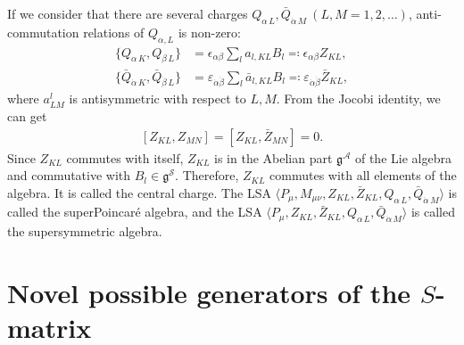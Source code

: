 \documentclass[a4paper,12pt]{article}
\def\nn{\nonumber}
\def\ua{\alpha}
\def\da{\dot{\alpha}}
\def\ub{\beta}
\def\db{\dot{\beta}}
\theoremstyle{plain}
\theoremstyle{definition}
\begin{document}
If we consider that there are several charges $Q_{\ua\, L}, \bar{Q}_{\da\, M}\ (L,M=1,2,\dots )$, anti-commutation relations of $Q_{\ua, L}$ is non-zero:
\begin{align}
\{ Q_{\ua\, K}, Q_{\ub\, L}\} 
&= \epsilon_{\ua \ub} \sum_l a_{l,KL}B_{l} \eqqcolon \epsilon_{\ua \ub} Z_{KL},\nn\\
\{\bar Q_{\da\, K}, \bar Q_{\db\, L}\} 
&= \varepsilon_{\da \db} \sum_l \bar a_{l,KL}B_{l} \eqqcolon \varepsilon_{\da \db} \bar Z_{KL},
\end{align}
where $a^l_{LM}$ is antisymmetric with respect to $L,M$.
From the Jocobi identity, we can get
\begin{align}\label{central}
[ Z_{KL}, Z_{MN}] = [ Z_{KL}, \bar Z_{MN}] = 0.
\end{align}
Since $Z_{KL}$ commutes with itself, $Z_{KL}$ is in the Abelian part $\mathfrak{g}^{\mathcal{A}}$ of the Lie algebra and commutative with $B_l \in \mathfrak{g}^\mathcal{S}$.
Therefore, $Z_{KL}$ commutes with all elements of the algebra. 
It is called the central charge.
The LSA $\langle P_{\mu}, M_{\mu\nu}, Z_{KL}, \bar Z_{KL}, Q_{\ua\, L}, \bar{Q}_{\da\, M}\rangle$ is called the superPoincar\'e algebra, and the LSA $\langle P_{\mu}, Z_{KL}, \bar Z_{KL}, Q_{\ua\, L}, \bar{Q}_{\da\, M}\rangle$ is called the supersymmetric algebra.

\section{Novel possible generators of the $S$-matrix}
\setcounter{equation}{0}
\end{document}
